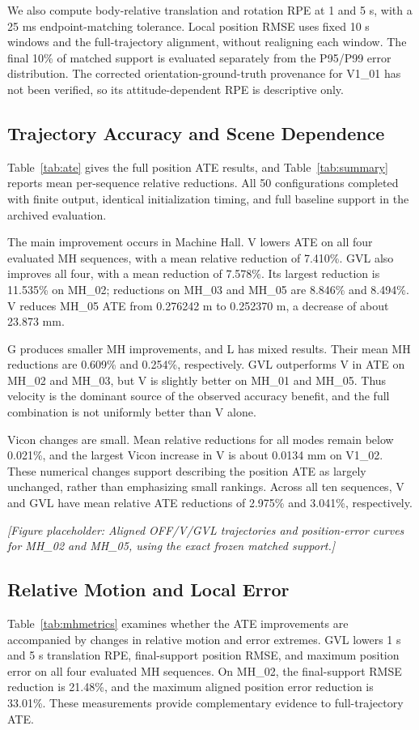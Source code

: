 \documentclass[a4paper,runningheads,twocolumn]{llncs}
\newcommand{\placeholder}[1]{\par\smallskip\noindent\textit{[Figure placeholder: #1]}\par\smallskip}
\begin{document}
We also compute body-relative translation and rotation RPE at 1 and 5 s, with a 25 ms endpoint-matching tolerance. Local position RMSE uses fixed 10 s windows and the full-trajectory alignment, without realigning each window. The final 10\% of matched support is evaluated separately from the P95/P99 error distribution. The corrected orientation-ground-truth provenance for V1\_01 has not been verified, so its attitude-dependent RPE is descriptive only.

\subsection{Trajectory Accuracy and Scene Dependence}
Table~\ref{tab:ate} gives the full position ATE results, and Table~\ref{tab:summary} reports mean per-sequence relative reductions. All 50 configurations completed with finite output, identical initialization timing, and full baseline support in the archived evaluation.



The main improvement occurs in Machine Hall. V lowers ATE on all four evaluated MH sequences, with a mean relative reduction of 7.410\%. GVL also improves all four, with a mean reduction of 7.578\%. Its largest reduction is 11.535\% on MH\_02; reductions on MH\_03 and MH\_05 are 8.846\% and 8.494\%. V reduces MH\_05 ATE from 0.276242 m to 0.252370 m, a decrease of about 23.873 mm.

G produces smaller MH improvements, and L has mixed results. Their mean MH reductions are 0.609\% and 0.254\%, respectively. GVL outperforms V in ATE on MH\_02 and MH\_03, but V is slightly better on MH\_01 and MH\_05. Thus velocity is the dominant source of the observed accuracy benefit, and the full combination is not uniformly better than V alone.

Vicon changes are small. Mean relative reductions for all modes remain below 0.021\%, and the largest Vicon increase in V is about 0.0134 mm on V1\_02. These numerical changes support describing the position ATE as largely unchanged, rather than emphasizing small rankings. Across all ten sequences, V and GVL have mean relative ATE reductions of 2.975\% and 3.041\%, respectively.

\placeholder{Aligned OFF/V/GVL trajectories and position-error curves for MH\_02 and MH\_05, using the exact frozen matched support.}

\subsection{Relative Motion and Local Error}
Table~\ref{tab:mhmetrics} examines whether the ATE improvements are accompanied by changes in relative motion and error extremes. GVL lowers 1 s and 5 s translation RPE, final-support position RMSE, and maximum position error on all four evaluated MH sequences. On MH\_02, the final-support RMSE reduction is 21.48\%, and the maximum aligned position error reduction is 33.01\%. These measurements provide complementary evidence to full-trajectory ATE.

\end{document}
